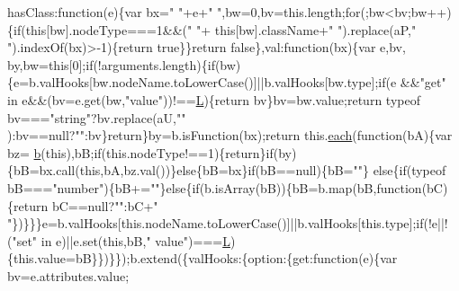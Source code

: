 \begin{DoxyCode}
      hasClass:\textcolor{keyword}{function}(e)\{var bx=\textcolor{stringliteral}{" "}+e+\textcolor{stringliteral}{" "},bw=0,bv=this.length;\textcolor{keywordflow}{for}(;bw<bv;bw++)\{\textcolor{keywordflow}{if}(\textcolor{keyword}{this}[bw].nodeType===1&&(\textcolor{stringliteral}{" "}+\textcolor{keyword}{
      this}[bw].className+\textcolor{stringliteral}{" "}).replace(aP,\textcolor{stringliteral}{" "}).indexOf(bx)>-1)\{\textcolor{keywordflow}{return} \textcolor{keyword}{true}\}\}\textcolor{keywordflow}{return} \textcolor{keyword}{false}\},val:\textcolor{keyword}{function}(bx)\{var e,bv,
      by,bw=\textcolor{keyword}{this}[0];\textcolor{keywordflow}{if}(!arguments.length)\{\textcolor{keywordflow}{if}(bw)\{e=b.valHooks[bw.nodeName.toLowerCase()]||b.valHooks[bw.type];\textcolor{keywordflow}{if}(e
      &&\textcolor{stringliteral}{"get"} in e&&(bv=e.get(bw,\textcolor{stringliteral}{"value"}))!==\hyperlink{jquery_8js_a38ee4c0b5f4fe2a18d0c783af540d253}{L})\{\textcolor{keywordflow}{return} bv\}bv=bw.value;\textcolor{keywordflow}{return} typeof bv===\textcolor{stringliteral}{"string"}?bv.replace(aU,\textcolor{stringliteral}{""}
      ):bv==null?\textcolor{stringliteral}{""}:bv\}\textcolor{keywordflow}{return}\}by=b.isFunction(bx);\textcolor{keywordflow}{return} this.\hyperlink{jquery_8js_a871ff39db627c54c710a3e9909b8234c}{each}(\textcolor{keyword}{function}(bA)\{var bz=
      \hyperlink{jquery_8js_aa4026ad5544b958e54ce5e106fa1c805}{b}(\textcolor{keyword}{this}),bB;\textcolor{keywordflow}{if}(this.nodeType!==1)\{\textcolor{keywordflow}{return}\}\textcolor{keywordflow}{if}(by)\{bB=bx.call(\textcolor{keyword}{this},bA,bz.val())\}\textcolor{keywordflow}{else}\{bB=bx\}\textcolor{keywordflow}{if}(bB==null)\{bB=\textcolor{stringliteral}{""}\}\textcolor{keywordflow}{
      else}\{\textcolor{keywordflow}{if}(typeof bB===\textcolor{stringliteral}{"number"})\{bB+=\textcolor{stringliteral}{""}\}\textcolor{keywordflow}{else}\{\textcolor{keywordflow}{if}(b.isArray(bB))\{bB=b.map(bB,\textcolor{keyword}{function}(bC)\{\textcolor{keywordflow}{return} bC==null?\textcolor{stringliteral}{""}:bC+\textcolor{stringliteral}{"
      "}\})\}\}\}e=b.valHooks[\textcolor{keyword}{this}.nodeName.toLowerCase()]||b.valHooks[this.type];\textcolor{keywordflow}{if}(!e||!(\textcolor{stringliteral}{"set"} in e)||e.set(\textcolor{keyword}{this},bB,\textcolor{stringliteral}{"
      value"})===\hyperlink{jquery_8js_a38ee4c0b5f4fe2a18d0c783af540d253}{L})\{this.value=bB\}\})\}\});b.extend(\{valHooks:\{option:\{\textcolor{keyword}{get}:\textcolor{keyword}{function}(e)\{var bv=e.attributes.value;\textcolor{keywordflow}{
}
\end{DoxyCode}

